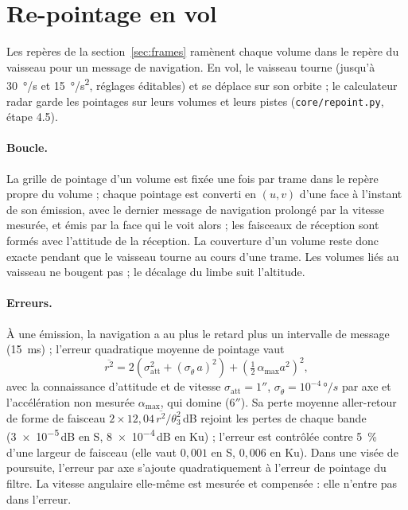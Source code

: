 \documentclass[11pt,a4paper]{article}
\newcommand{\code}[1]{\texttt{\small #1}}
\begin{document}
\section{Re-pointage en vol}\label{sec:repoint}
Les repères de la section~\ref{sec:frames} ramènent chaque volume dans le repère du vaisseau pour un message de
navigation. En vol, le vaisseau tourne (jusqu'à \SI{30}{\degree/s} et \SI{15}{\degree/s^2}, réglages éditables) et se
déplace sur son orbite ; le calculateur radar garde les pointages sur leurs volumes et leurs pistes
(\code{core/repoint.py}, étape 4.5).

\paragraph{Boucle.} La grille de pointage d'un volume est fixée une fois par trame dans le repère propre du volume ;
chaque pointage est converti en $(u,v)$ d'une face à l'instant de son émission, avec le dernier message de navigation
prolongé par la vitesse mesurée, et émis par la face qui le voit alors ; les faisceaux de réception sont formés avec
l'attitude de la réception. La couverture d'un volume reste donc exacte pendant que le vaisseau tourne au cours d'une
trame. Les volumes liés au vaisseau ne bougent pas ; le décalage du limbe suit l'altitude.

\paragraph{Erreurs.} À une émission, la navigation a au plus le retard plus un intervalle de message
(\SI{15}{ms}) ; l'erreur quadratique moyenne de pointage vaut
\[
  \overline{r^2} = 2\left(\sigma_{\mathrm{att}}^2 + (\sigma_{\dot\theta}\,a)^2\right) + \left(\tfrac12\,\alpha_{\max}a^2\right)^2,
\]
avec la connaissance d'attitude et de vitesse $\sigma_{\mathrm{att}} = 1''$, $\sigma_{\dot\theta} = 10^{-4}\,\si{\degree/s}$
par axe et l'accélération non mesurée $\alpha_{\max}$, qui domine ($6''$). Sa perte moyenne aller-retour de forme de
faisceau $2\times12,04\,\overline{r^2}/\theta_3^2$\,dB rejoint les pertes de chaque bande (\num{3e-5}\,dB en S,
\num{8e-4}\,dB en Ku) ; l'erreur est contrôlée contre \SI{5}{\percent} d'une largeur de faisceau (elle vaut $0,001$ en
S, $0,006$ en Ku). Dans une visée de poursuite, l'erreur par axe s'ajoute quadratiquement à l'erreur de pointage du
filtre. La vitesse angulaire elle-même est mesurée et compensée : elle n'entre pas dans l'erreur.
\end{document}
